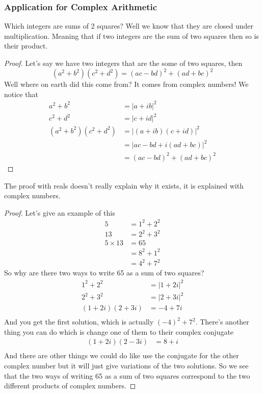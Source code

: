 \documentclass{article}
\begin{document}
\subsubsection{Application for Complex Arithmetic}
Which integers are sums of 2 squares? Well we know that they are
closed under multiplication. Meaning that if two integers are the sum of two squares then so is
their product.
\begin{proof}
	Let's say we have two integers that are the some of two squares, then
	\begin{displaymath}
		(a^2+b^2)(c^2+d^2) = (ac-bd)^2 + (ad+bc)^2
	\end{displaymath}
	Well where on earth did this come from? It comes from complex numbers!
	We notice that
	\begin{align*}
		a^2+b^2            & = |a+ib|^2              \\
		c^2+d^2            & = |c+id|^2              \\
		(a^2+b^2)(c^2+d^2) & = |(a+ib)(c+id)|^2      \\
		                   & = |ac-bd + i(ad+bc)|^2  \\
		                   & = (ac-bd)^2 + (ad+bc)^2
	\end{align*}
\end{proof}
\noindent The proof with reals doesn't really explain why it exists, it is explained with
complex numbers.
\begin{proof}
	Let's give an example of this
	\begin{align*}
		5           & = 1^2 + 2^2     \\
		13          & = 2^2 + 3^2     \\
		5 \times 13 & = 65            \\
		            & = 8^{2} + 1^{2} \\
		            & = 4^{2} + 7^{2}
	\end{align*}
	So why are there two ways to write 65 as a sum of two squares?
	\begin{align*}
		1^{2} + 2^{2} & = |1+2i|^2 \\
		2^2 + 3^2     & = |2+3i|^2 \\
		(1+2i)(2+3i)  & = -4 + 7i  \\
	\end{align*}
	And you get the first solution, which is actually $(-4)^2 + 7^2$. There's another thing you can do
	which is change one of them to their complex conjugate
	\begin{align*}
		(1+2i)(2-3i) & = 8 + i \\
	\end{align*}
	And there are other things we could do like use the conjugate for the other complex number but it
	will just give variations of the two solutions. So we see that the two ways of writing 65 as a sum
	of two squares correspond to the two different products of complex numbers.
\end{proof}
\end{document}
